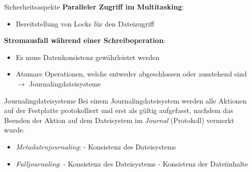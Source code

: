 \begin{bonus}{Sicherheitsaspekte}
    \textbf{Paralleler Zugriff im Multitasking}:
    \begin{itemize}
        \item Bereitstellung von Locks für den Dateizugriff
    \end{itemize}

    \textbf{Stromausfall während einer Schreiboperation}:
    \begin{itemize}
        \item Es muss Datenkonsistenz gewährleistet werden
        \item Atomare Operationen, welche entweder abgeschlossen oder ausstehend sind
              \subitem $\to$ Journalingdateisysteme
    \end{itemize}
\end{bonus}

\begin{defi}{Journalingdateisysteme}
    Bei einem Journalingdateisystem werden alle Aktionen auf der Festplatte protokolliert
    und erst als gültig aufgefasst, nachdem das Beenden der Aktion auf dem Dateisystem
    im \emph{Journal} (Protokoll) vermerkt wurde.

    \begin{itemize}
        \item \emph{Metadatenjournaling}:
              \subitem - Konsistenz des Dateisystems
        \item \emph{Fulljournaling}:
              \subitem - Konsistenz des Dateisystems
              \subitem - Konsistenz der Dateiinhalte
    \end{itemize}

\end{defi}
